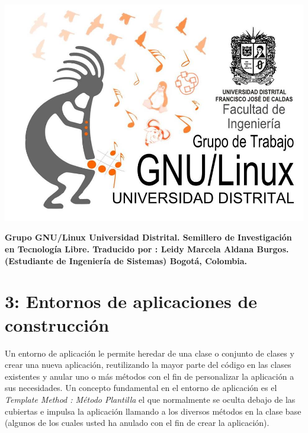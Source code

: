 \documentclass{article}
\begin{document}
\includegraphics[width=\textwidth]{GLUDing.jpg}

\newpage

\textbf{Grupo GNU/Linux Universidad Distrital. \newline
Semillero de Investigación en Tecnología Libre. \newline
Traducido por : \newline Leidy Marcela Aldana Burgos. \newline (Estudiante de Ingeniería de Sistemas) 
\newline
Bogotá, Colombia. }\newline

\vspace{1.0cm}
\newpage









\section{3: Entornos de aplicaciones de construcción}

Un entorno de aplicación le permite heredar de una clase o conjunto de clases y crear una nueva aplicación, reutilizando la mayor parte del código en las clases existentes y anular uno o más métodos con el fin de personalizar la aplicación a sus necesidades. Un concepto fundamental en el entorno de aplicación es el \textit{Template Method : Método Plantilla} el 
que normalmente se oculta debajo de las cubiertas e impulsa la aplicación  llamando a los diversos métodos en la clase base (algunos de los cuales usted ha anulado con el fin de crear la aplicación).    \newline
\end{document}
